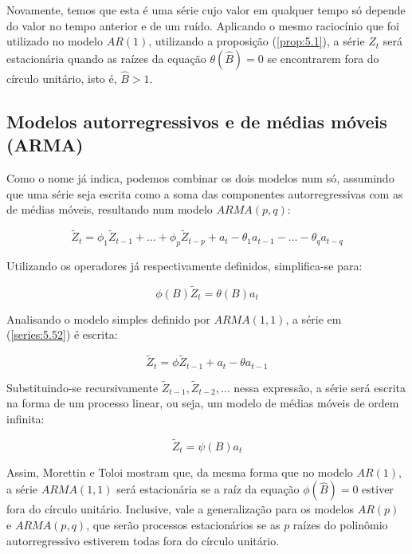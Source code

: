 Novamente, temos que esta é uma série cujo valor em qualquer tempo só depende do valor no tempo anterior e de um ruído. Aplicando o mesmo raciocínio que foi utilizado no modelo $AR(1)$, utilizando a proposição (\ref{prop:5.1}), a série $Z_t$ será estacionária quando as raízes da equação $\theta(\hat{B}) = 0$ se encontrarem fora do círculo unitário, isto é, $\hat{B} > 1$.


\subsection{Modelos autorregressivos e de médias móveis (ARMA)}

Como o nome já indica, podemos combinar os dois modelos num só, assumindo que uma série seja escrita como a soma das componentes autorregressivas com as de médias móveis, resultando num modelo $ARMA(p, q)$:

\begin{equation}\label{series:5.52}
\tilde{Z}_t = \phi_1 \tilde{Z}_{t-1} + \ldots + \phi_p \tilde{Z}_{t-p} + a_t - \theta_1 a_{t-1} - \ldots - \theta_q a_{t-q}
\end{equation}

Utilizando os operadores já respectivamente definidos, simplifica-se para:

\begin{equation}\label{series:5.53}
\phi(B)\tilde{Z}_t = \theta(B)a_t
\end{equation}

Analisando o modelo simples definido por $ARMA(1, 1)$, a série em (\ref{series:5.52}) é escrita:

\begin{equation}\label{series:5.54}
\tilde{Z}_t = \phi \tilde{Z}_{t-1} + a_t - \theta a_{t-1}
\end{equation}

Substituindo-se recursivamente $\tilde{Z}_{t-1}, \tilde{Z}_{t-2}, \ldots$ nessa expressão, a série será escrita na forma de um processo linear, ou seja, um modelo de médias móveis de ordem infinita:

\[
\tilde{Z}_t = \psi(B)a_t
\]

Assim, Morettin e Toloi \citep{morettin} mostram que, da mesma forma que no modelo $AR(1)$, a série $ARMA(1,1)$ será estacionária se a raíz da equação $\phi(\hat{B}) = 0$ estiver fora do círculo unitário. Inclusive, vale a generalização para os modelos $AR(p)$ e $ARMA(p,q)$, que serão processos estacionários se as $p$ raízes do polinômio autorregressivo estiverem todas fora do círculo unitário.

